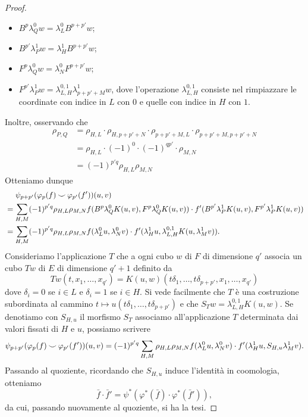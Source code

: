 \begin{proof}
\begin{itemize}
\item $B^p\lambda^0_Qw=\lambda^0_LB^{p+p'}w$;
\item $B^{p'}\lambda^1_Pw=\lambda^1_HB^{p+p'}w$;
\item $F^p\lambda^0_Qw=\lambda^0_NF^{p+p'}w$;
\item $F^{p'}\lambda^1_Pw=\lambda^{0,1}_{L,H}\lambda^1_{p+p'+M}w$, dove l'operazione $\lambda^{0,1}_{L,H}$ consiste nel rimpiazzare le coordinate con indice in $L$ con $0$ e quelle con indice in $H$ con $1$.
\end{itemize}
Inoltre, osservando che
\begin{align*}
\rho_{P,Q}&=\rho_{H,L}\cdot\rho_{H,p+p'+N}\cdot\rho_{p+p'+M,L}\cdot\rho_{p+p'+M,p+p'+N}\\
&=\rho_{H,L}\cdot (-1)^0\cdot(-1)^{qp'}\cdot\rho_{M,N}\\
&=(-1)^{p'q}\rho_{H,L}\rho_{M,N} 
\end{align*}
Otteniamo dunque
\begin{align*}
&\phantomop\psi_{p+p'}(\varphi_p(f)\cupp\varphi_{p'}(f'))(u,v)\\
&=\sum_{H,M}(-1)^{p'q}\rho_{H,L}\rho_{M,N} f(B^p\lambda^0_QK(u,v),F^p\lambda^0_QK(u,v))\cdot f'(B^{p'}\lambda^1_PK(u,v),F^{p'}\lambda^1_PK(u,v))\\
&=\sum_{H,M}(-1)^{p'q}\rho_{H,L}\rho_{M,N}f(\lambda^0_Lu,\lambda^0_Nv)\cdot f'(\lambda^1_Hu,\lambda^{0,1}_{L,H}K(u,\lambda^1_Mv)).
\end{align*}
Consideriamo l'applicazione $T$ che a ogni cubo $w$ di $F$ di dimensione $q'$ associa un cubo $Tw$ di $E$ di dimensione $q'+1$ definito da
$$
Tw(t,x_1,\ldots,x_{q'})=K(u,w)(t\delta_1,\ldots,t\delta_{p+p'},x_1,\ldots,x_{q'})
$$
dove $\delta_i=0$ se $i\in L$ e $\delta_i=1$ se $i\in H$. Si vede facilmente che $T$ è una costruzione subordinata al cammino $t\mapsto u(t\delta_1,\ldots,t\delta_{p+p'})$ e che $S_Tw=\lambda^{0,1}_{L,H}K(u,w)$. Se denotiamo con $S_{H,u}$ il morfismo $S_T$ associamo all'applicazione $T$ determinata dai valori fissati di $H$ e $u$, possiamo scrivere
$$
\psi_{p+p'}(\varphi_p(f)\mathbin{\smile}\varphi_{p'}(f'))(u,v)=(-1)^{p'q}\sum_{H,M}\rho_{H,L}\rho_{M,N}f(\lambda^0_Lu,\lambda^0_Nv)\cdot f'(\lambda^1_Hu,S_{H,u}\lambda^1_Mv).
$$
Passando al quoziente, ricordando che $S_{H,u}$ induce l'identità in coomologia, otteniamo
$$
\bar{f}\cdot\bar{f}'=\psi^*(\varphi^*(\bar{f})\cdot\varphi^*(\bar{f}')),
$$
da cui, passando nuovamente al quoziente, si ha la tesi.
\end{proof}


